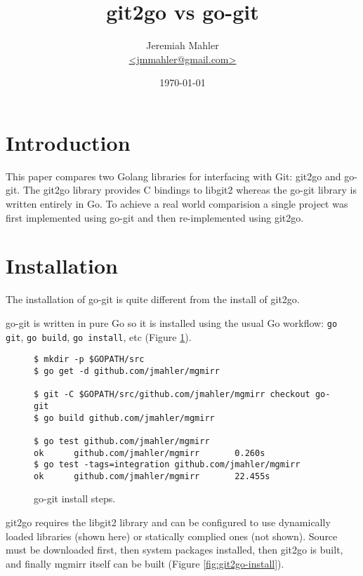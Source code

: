 \documentclass{article}
\begin{document}
\title{git2go vs go-git}
\author{
	\Large{Jeremiah Mahler}\\
	\small{\href{mailto:jmmahler@gmail.com}{\textless jmmahler@gmail.com\textgreater}}
}
\date{\today}
\maketitle

\thispagestyle{empty}
\tableofcontents

\section{Introduction}

This paper compares two Golang libraries for interfacing with Git:
git2go\autocite{git2go} and go-git\autocite{go-git}.
The git2go library provides C bindings to libgit2\autocite{libgit2}
whereas the go-git library is written entirely in Go.
To achieve a real world comparision a single project was first
implemented using go-git\autocite{mgmirrgo-git} and then
re-implemented using git2go\autocite{mgmirrgit2go}.

\clearpage
\section{Installation}

The installation of go-git is quite different from the install of git2go.

go-git is written in pure Go so it is installed using the usual
Go workflow: \verb+go git+, \verb+go build+, \verb+go install+, etc (Figure \ref{fig:go-git-install}).

\begin{figure}[!ht]
\begin{lstlisting}
$ mkdir -p $GOPATH/src
$ go get -d github.com/jmahler/mgmirr

$ git -C $GOPATH/src/github.com/jmahler/mgmirr checkout go-git
$ go build github.com/jmahler/mgmirr

$ go test github.com/jmahler/mgmirr
ok      github.com/jmahler/mgmirr       0.260s
$ go test -tags=integration github.com/jmahler/mgmirr
ok      github.com/jmahler/mgmirr       22.455s
\end{lstlisting}
\caption{go-git install steps.}
\label{fig:go-git-install}
\end{figure}

git2go requires the libgit2 library and can be configured to use
dynamically loaded libraries (shown here) or statically complied ones
(not shown).  Source must be downloaded first, then system packages
installed, then git2go is built, and finally mgmirr itself can be built
(Figure \ref{fig:git2go-install}).
\end{document}
